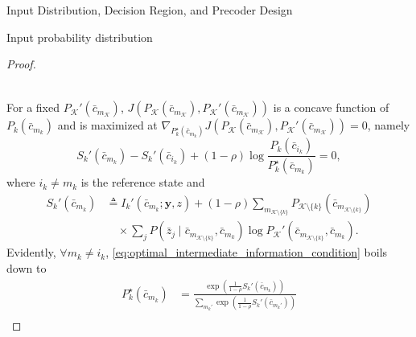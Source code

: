\documentclass[journal]{IEEEtran}
\begin{document}
\begin{section}{Input Distribution, Decision Region, and Precoder Design}
\begin{subsection}{Input probability distribution}
\begin{proof}
\begin{figure*}[!b]
\begin{align}
						\label{eq:intermediate_information_function}
					\end{align}
				\end{figure*}
				For a fixed $P_{\mathcal{K}}'(\bar{c}_{m_{\mathcal{K}}})$, $J \left( P_{\mathcal{K}}(\bar{c}_{m_{\mathcal{K}}}),P_{\mathcal{K}}'(\bar{c}_{m_{\mathcal{K}}}) \right)$ is a concave function of $P_k(\bar{c}_{m_k})$ and is maximized at $\nabla_{P_k^{\star}(\bar{c}_{m_k})} J \left( P_{\mathcal{K}}(\bar{c}_{m_{\mathcal{K}}}),P_{\mathcal{K}}'(\bar{c}_{m_{\mathcal{K}}}) \right) = 0$, namely
				\begin{equation}
					S_k'(\bar{c}_{m_k}) - S_k'(\bar{c}_{i_k}) + (1 - \rho) \log \frac{P_k(\bar{c}_{i_k})}{P_k^{\star}(\bar{c}_{m_k})} = 0,
					\label{eq:optimal_intermediate_information_condition}
				\end{equation}
				where $i_k \ne m_k$ is the reference state and
				\begin{align}
					S_k'(\bar{c}_{m_k})
					& \triangleq I_k'(\bar{c}_{m_k};\boldsymbol{y},z) + (1 - \rho) \sum_{m_{\mathcal{K} \setminus \{k\}}} P_{\mathcal{K} \setminus \{k\}}(\bar{c}_{m_{\mathcal{K} \setminus \{k\}}})\nonumber\\
					& \quad \times \sum_j P(\bar{z}_j \mid \bar{c}_{m_{\mathcal{K} \setminus \{k\}}},\bar{c}_{m_k}) \log P_{\mathcal{K}}'(\bar{c}_{m_{\mathcal{K} \setminus \{k\}}},\bar{c}_{m_k}).
				\end{align}
				Evidently, $\forall m_k \ne i_k$, \eqref{eq:optimal_intermediate_information_condition} boils down to
				\begin{subequations}
					\begin{align}
						P_k^{\star}(\bar{c}_{m_k})
						& = \frac{\exp \left( \frac{1}{1 - \rho} S_k'(\bar{c}_{m_k}) \right)}{\sum_{m_k'} \exp \left( \frac{1}{1 - \rho} S_k'(\bar{c}_{m_k'}) \right)}\\

\end{align}
\end{subequations}
\end{proof}
\end{subsection}
\end{section}
\end{document}
